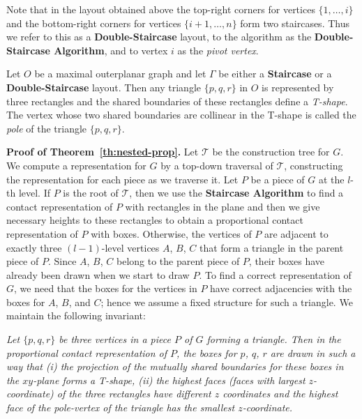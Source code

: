 \documentclass{llncs}
\begin{document}
Note that in the layout obtained above the top-right corners for vertices $\{1, \ldots, i\}$ and the bottom-right corners for vertices $\{i+1, \ldots, n\}$ form two staircases.
Thus we refer to this as a \textbf{Double-Staircase} layout,  to the algorithm as the \textbf{Double-Staircase Algorithm}, and to vertex $i$ as the \textit{pivot vertex}.




Let $O$ be a maximal outerplanar graph and let $\Gamma$ be either a \textbf{Staircase} or
 a \textbf{Double-Staircase} layout. Then any triangle $\{p,q,r\}$ in $O$ is represented by three rectangles and the shared boundaries of these rectangles define a \textit{T-shape}. The vertex whose two shared boundaries are  collinear in the T-shape is called the \textit{pole} of the triangle $\{p,q,r\}$.







\smallskip\noindent
\textbf{Proof of Theorem~\ref{th:nested-prop}.}
	Let $\mathcal{T}$ be the construction tree for $G$. We compute a
	representation for $G$ by a top-down traversal of $\mathcal{T}$, constructing the
	representation for each piece as we traverse it. Let $P$ be a piece of $G$ at the
	$l$-th level. If $P$ is the root of $\mathcal{T}$, then we use the
	\textbf{Staircase Algorithm} to find a contact representation of $P$ with rectangles
	in the plane and then we give necessary heights to these rectangles to obtain a proportional
	contact representation of $P$ with boxes.
Otherwise, the vertices of $P$ are adjacent to exactly three $(l-1)$-level vertices
	$A$, $B$, $C$ that form a triangle in the parent piece of $P$.
	Since $A$, $B$, $C$ belong to the parent piece of $P$, their boxes have already been
	drawn when we start to draw $P$. To find a correct
	representation of $G$, we need that the boxes for the vertices in $P$ have correct
	adjacencies with the boxes for
	$A$, $B$, and $C$; hence we assume a fixed structure for such a triangle.
We maintain the following invariant:
	
	
	\textit{Let $\{p,q,r\}$ be three vertices in a piece $P$ of $G$ forming a triangle.
	 Then in the proportional contact representation of $P$, the boxes for $p$, $q$, $r$
	 are drawn in such a way that (i) the projection of the mutually shared boundaries for
	 these boxes in the $xy$-plane forms a T-shape, (ii) the highest faces (faces
	 with largest $z$-coordinate) of the three rectangles have different $z$ coordinates
	and the highest face of the pole-vertex of the triangle has the smallest
	 $z$-coordinate.}
\end{document}
